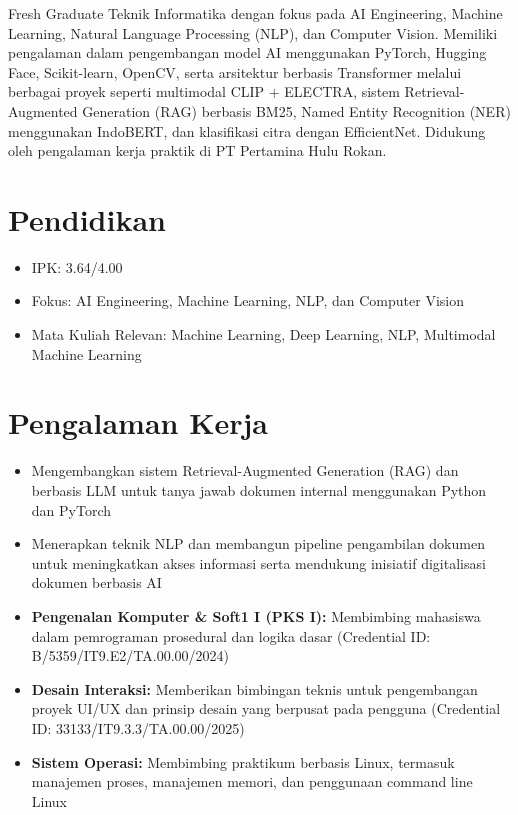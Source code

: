 Fresh Graduate Teknik Informatika dengan fokus pada AI Engineering, Machine Learning, Natural Language Processing (NLP), dan Computer Vision. Memiliki pengalaman dalam pengembangan model AI menggunakan PyTorch, Hugging Face, Scikit-learn, OpenCV, serta arsitektur berbasis Transformer melalui berbagai proyek seperti multimodal CLIP + ELECTRA, sistem Retrieval-Augmented Generation (RAG) berbasis BM25, Named Entity Recognition (NER) menggunakan IndoBERT, dan klasifikasi citra dengan EfficientNet. Didukung oleh pengalaman kerja praktik di PT Pertamina Hulu Rokan.

\section*{Pendidikan}
\begin{itemize}
  \item IPK: 3.64/4.00
  \item Fokus: AI Engineering, Machine Learning, NLP, dan Computer Vision
  \item Mata Kuliah Relevan: Machine Learning, Deep Learning, NLP, Multimodal Machine Learning
\end{itemize}

\section*{Pengalaman Kerja}
\begin{itemize}
  \item Mengembangkan sistem Retrieval-Augmented Generation (RAG) dan berbasis LLM untuk tanya jawab dokumen internal menggunakan Python dan PyTorch
  \item Menerapkan teknik NLP dan membangun pipeline pengambilan dokumen untuk meningkatkan akses informasi serta mendukung inisiatif digitalisasi dokumen berbasis AI
\end{itemize}

\begin{itemize}
  \item \textbf{Pengenalan Komputer \& Soft1 I (PKS I):} Membimbing mahasiswa dalam pemrograman prosedural dan logika dasar (Credential ID: B/5359/IT9.E2/TA.00.00/2024)
  \item \textbf{Desain Interaksi:} Memberikan bimbingan teknis untuk pengembangan proyek UI/UX dan prinsip desain yang berpusat pada pengguna (Credential ID: 33133/IT9.3.3/TA.00.00/2025)
  \item \textbf{Sistem Operasi:} Membimbing praktikum berbasis Linux, termasuk manajemen proses, manajemen memori, dan penggunaan command line Linux
\end{itemize}

